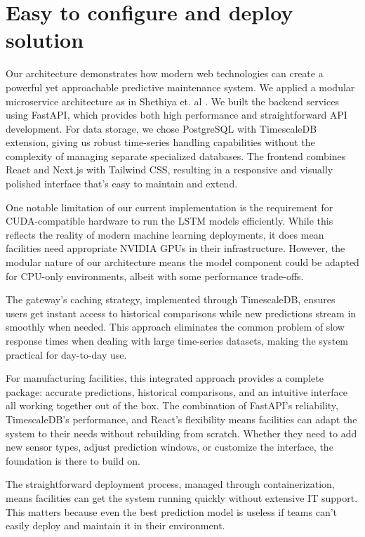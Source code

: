 \section{Easy to configure and deploy solution}
Our architecture demonstrates how modern web technologies can create a powerful yet approachable predictive maintenance system. We applied a modular microservice architecture as in Shethiya et. al \cite{shethiya2025building}.  We built the backend services using FastAPI, which provides both high performance and straightforward API development. For data storage, we chose PostgreSQL with TimescaleDB extension, giving us robust time-series handling capabilities without the complexity of managing separate specialized databases. The frontend combines React and Next.js with Tailwind CSS, resulting in a responsive and visually polished interface that's easy to maintain and extend.

One notable limitation of our current implementation is the requirement for CUDA-compatible hardware to run the LSTM models efficiently. While this reflects the reality of modern machine learning deployments, it does mean facilities need appropriate NVIDIA GPUs in their infrastructure. However, the modular nature of our architecture means the model component could be adapted for CPU-only environments, albeit with some performance trade-offs.

The gateway's caching strategy, implemented through TimescaleDB, ensures users get instant access to historical comparisons while new predictions stream in smoothly when needed. This approach eliminates the common problem of slow response times when dealing with large time-series datasets, making the system practical for day-to-day use.

For manufacturing facilities, this integrated approach provides a complete package: accurate predictions, historical comparisons, and an intuitive interface all working together out of the box. The combination of FastAPI's reliability, TimescaleDB's performance, and React's flexibility means facilities can adapt the system to their needs without rebuilding from scratch. Whether they need to add new sensor types, adjust prediction windows, or customize the interface, the foundation is there to build on.

The straightforward deployment process, managed through containerization, means facilities can get the system running quickly without extensive IT support. This matters because even the best prediction model is useless if teams can't easily deploy and maintain it in their environment.